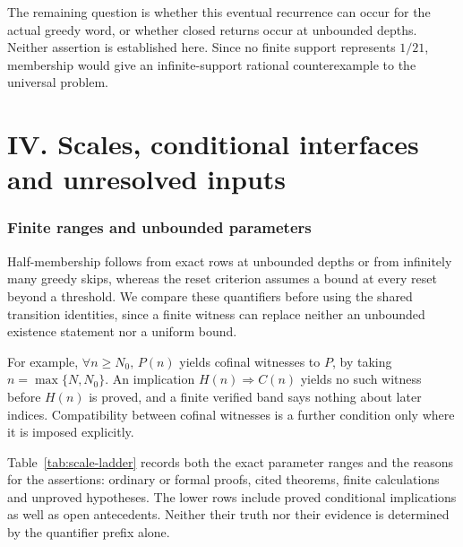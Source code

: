 \documentclass[11pt]{article}
\theoremstyle{plain}
\theoremstyle{definition}
\theoremstyle{remark}
\begin{document}
The remaining question is whether this eventual recurrence can occur
for the actual greedy word, or whether closed returns occur at
unbounded depths. Neither assertion is established here. Since no
finite support represents $1/21$, membership would give an
infinite-support rational counterexample to the universal problem.

\clearpage
\part*{IV. Scales, conditional interfaces and unresolved inputs}
\section{Finite ranges and unbounded parameters}
\label{sec:scale-ladder}
Half-membership follows from exact rows at unbounded depths or from
infinitely many greedy skips, whereas the reset criterion assumes a
bound at every reset beyond a threshold. We compare these quantifiers
before using the shared transition identities, since a finite witness
can replace neither an unbounded existence statement nor a uniform
bound.

For example, $\forall n\ge N_0,\,P(n)$ yields cofinal witnesses to
$P$, by taking $n=\max\{N,N_0\}$. An implication
$H(n)\Rightarrow C(n)$ yields no such witness before $H(n)$ is proved,
and a finite verified band says nothing about later indices.
Compatibility between cofinal witnesses is a further condition only
where it is imposed explicitly.

Table~\ref{tab:scale-ladder} records both the exact parameter ranges and
the reasons for the assertions: ordinary or formal proofs, cited
theorems, finite calculations and unproved hypotheses. The lower rows
include proved conditional implications as well as open antecedents.
Neither their truth nor their evidence is determined by the quantifier
prefix alone.
\end{document}

